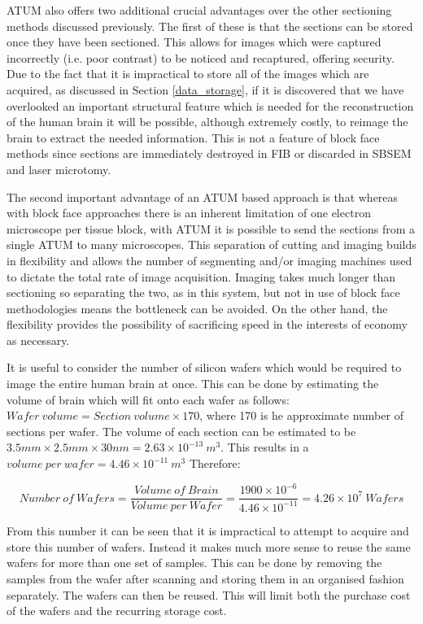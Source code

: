 \documentclass[a4paper, 11pt]{article}
\numberwithin{equation}{section}
\begin{document}
	ATUM also offers two additional crucial advantages over the other sectioning methods discussed previously. The first of these is that the sections can be stored once they have been sectioned. This allows for images which were captured incorrectly (i.e. poor contrast) to be noticed and recaptured, offering security. Due to the fact that it is impractical to store all of the images which are acquired, as discussed in Section \ref{data_storage}, if it is discovered that we have overlooked an important structural feature which is needed for the reconstruction of the human brain it will be possible, although extremely costly, to reimage the brain to extract the needed information. This is not a feature of block face methods since sections are  immediately destroyed in FIB or discarded in SBSEM and laser microtomy.
	
	The second important advantage of an ATUM based approach is that whereas with block face approaches there is an inherent limitation of one electron microscope per tissue block, with ATUM it is possible to send the sections from a single ATUM to many microscopes. This separation of cutting and imaging builds in flexibility and allows the number of segmenting and/or imaging machines used to dictate the total rate of image acquisition. Imaging takes much longer than sectioning so separating the two, as in this system, but not in use of block face methodologies means the bottleneck can be avoided. On the other hand, the flexibility provides the possibility of sacrificing speed in the interests of economy as necessary.
	
	It is useful to consider the number of silicon wafers which would be required to image the entire human brain at once. This can be done by estimating the volume of brain which will fit onto each wafer as follows: $Wafer\ volume = Section\ volume \times 170$, where 170 is he approximate number of sections per wafer. The volume of each section can be estimated to be $3.5mm \times 2.5mm \times 30 nm = 2.63\times10^{-13}\ m^3$. This results in a $volume\ per\ wafer = 4.46\times10^{-11}\ m^3$ Therefore:
	
	\begin{equation}
	Number\ of\ Wafers = \frac{Volume\ of\ Brain}{Volume\ per\ Wafer} = \frac{1900\times10^{-6}}{4.46\times10^{-11}} = 4.26\times10^{7}\ Wafers
	\end{equation}
	
	From this number it can be seen that it is impractical to attempt to acquire and store this number of wafers. Instead it makes much more sense to reuse the same wafers for more than one set of samples. This can be done by removing the samples from the wafer after scanning and storing them in an organised fashion separately. The wafers can then be reused. This will limit both the purchase cost of the wafers and the recurring storage cost.
	
\end{document}
